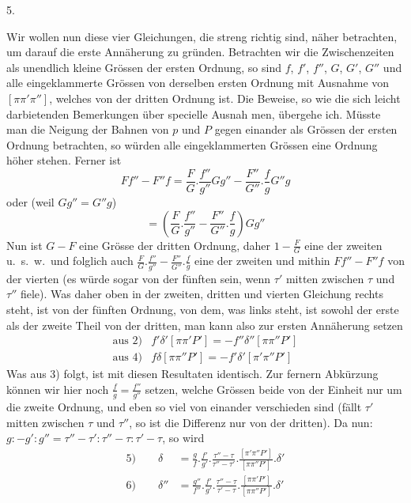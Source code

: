 \begin{center}5.\end{center}
Wir wollen nun diese vier Gleichungen, die streng richtig sind, näher betrachten, um darauf die erste Annäherung zu gründen. Betrachten wir die Zwischenzeiten als unendlich kleine Grössen der ersten Ordnung, so sind $f$, $f'$, $f''$, $G$, $G'$, $G''$ und alle eingeklammerte Grössen von derselben ersten Ordnung mit Ausnahme von $[\pi\pi'\pi'']$, welches von der dritten Ordnung ist. Die Beweise, so wie die sich leicht darbietenden Bemerkungen über specielle Ausnah%
%
men, übergehe ich. Müsste man die Neigung der Bahnen von $p$ und $P$ gegen einander als Grössen der ersten Ordnung betrachten, so würden alle eingeklammerten Grössen eine Ordnung höher stehen. Ferner ist
\[
Ff''-F''f=\frac FG.\frac{f''}{g''}Gg''-\frac{F''}{G''}.\frac fg G''g
\]
oder (weil $Gg''=G''g$)
\[
=\left(\frac FG.\frac{f''}{g''}-\frac{F''}{G''}.\frac fg\right)Gg''
\]
Nun ist $G-F$ eine Grösse der dritten Ordnung, daher $1-\frac FG$ eine der zweiten u.\ s.\ w.\ und folglich auch $\frac FG.\frac{f''}{g''}-\frac{F''}{G''}.\frac fg$ eine der zweiten und mithin $Ff''-F''f$ von der vierten (es würde sogar von der fünften sein, wenn $\tau'$ mitten zwischen $\tau$ und $\tau''$ fiele). Was daher oben in der zweiten, dritten und vierten Gleichung rechts steht, ist von der fünften Ordnung, von dem, was links steht, ist sowohl der erste als der zweite Theil von der dritten, man kann also zur ersten Annäherung setzen
\[
\begin{array}{ll}
\text{aus 2)}&f'\delta'[\pi\pi'P']=-f''\delta''[\pi\pi''P']\\
\text{aus 4)}&f\delta[\pi\pi''P']=-f'\delta'[\pi'\pi''P']
\end{array}
\]
Was aus 3) folgt, ist mit diesen Resultaten identisch. Zur fernern Abkürzung können wir hier noch $\frac fg=\frac{f''}{g''}$ setzen, welche Grössen beide von der Einheit nur um die zweite Ordnung, und eben so viel von einander verschieden sind (fällt $\tau'$ mitten zwischen $\tau$ und $\tau''$, so ist die Differenz nur von der dritten). Da nun: $g:-g':g''=\tau''-\tau':\tau''-\tau:\tau'-\tau$, so wird
\[
\begin{aligned}
5)\qquad\delta&=\frac gf.\frac{f'}{g'}.\frac{\tau''-\tau}{\tau''-\tau'}.\frac{[\pi'\pi''P']}{[\pi\pi''P']}.\delta'\\
6)\qquad\delta''&=\frac{g''}{f''}.\frac{f'}{g'}.\frac{\tau''-\tau}{\tau'-\tau}.\frac{[\pi\pi'P']}{[\pi\pi''P']}.\delta'
\end{aligned}
\]

